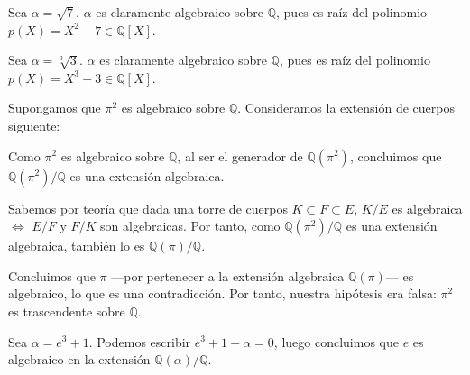 \documentclass[a4paper, 11pt]{article}
\begin{document}
  \begin{solucion}
      \begin{apartado}
          Sea $\alpha = \sqrt{7}$. $\alpha$ es claramente algebraico sobre $\mathbb{Q}$, pues es raíz del polinomio $p(X) = X^2 - 7 \in \mathbb{Q}[X]$.
      \end{apartado}

      \begin{apartado}
          Sea $\alpha = \sqrt[3]{3}$. $\alpha$ es claramente algebraico sobre $\mathbb{Q}$, pues es raíz del polinomio $p(X) = X^3 - 3 \in \mathbb{Q}[X]$.
      \end{apartado}

      \begin{apartado}
          Supongamos que $\pi^2$ es algebraico sobre $\mathbb{Q}$. Consideramos la extensión de cuerpos siguiente:

          \begin{figure}[h]
              \centering
          \end{figure}

          Como $\pi^2$ es algebraico sobre $\mathbb{Q}$, al ser el generador de $\mathbb{Q}(\pi^2)$, concluimos que $\mathbb{Q}(\pi^2)/\mathbb{Q}$ es una extensión algebraica.

          Sabemos por teoría que dada una torre de cuerpos $K \subset F \subset E$, $K/E$ es algebraica $\iff$ $E/F$ y $F/K$ son algebraicas. Por tanto, como  $\mathbb{Q}(\pi^2)/\mathbb{Q}$ es una extensión algebraica, también lo es $\mathbb{Q}(\pi)/\mathbb{Q}$.

          Concluimos que $\pi$ ---por pertenecer a la extensión algebraica $\mathbb{Q}(\pi)$--- es algebraico, lo que es una contradicción. Por tanto, nuestra hipótesis era falsa: $\pi^2$ es trascendente sobre $\mathbb{Q}$.
      \end{apartado}

      \begin{apartado}
          Sea $\alpha = e^3+1$. Podemos escribir $e^3 + 1 - \alpha = 0$, luego concluimos que $e$ es algebraico en la extensión $\mathbb{Q}(\alpha)/\mathbb{Q}$.


\end{apartado}
\end{solucion}
\end{document}

